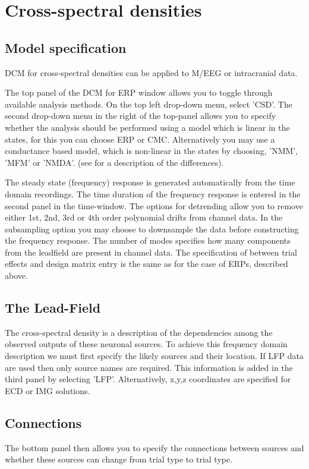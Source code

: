 \section{Cross-spectral densities}

\subsection{Model specification}
DCM for cross-spectral densities can be applied to M/EEG or intracranial data.

The top panel of the DCM for ERP window allows you to toggle through available analysis methods. On the top left drop-down menu, select 'CSD'. The second drop-down menu in the right of the top-panel allows you to specify whether the analysis should be performed using a model which is linear in the states, for this you can choose ERP or CMC. Alternatively you may use a conductance based model, which is non-linear in the states by choosing, 'NMM', 'MFM' or 'NMDA'. (see \cite{andre_sigmoid} for a description of the differences).

The steady state (frequency) response is generated automatically from the time domain recordings. The time duration of the frequency response is entered in the second panel in the time-window.  The options for detrending allow you to remove either 1st, 2nd, 3rd or 4th order polynomial drifts from channel data. In the subsampling option you may choose to downsample the data before constructing the frequency response. The number of modes specifies how many components from the leadfield are present in channel data. The specification of between trial effects and design matrix entry is the same as for the case of ERPs, described above.

\subsection{The Lead-Field}
The cross-spectral density is a description of the dependencies among the observed outputs of these neuronal sources. To achieve this frequency domain description we must first specify the likely sources and their location. If LFP data are used then only source names are required. This information is added in the third panel by selecting 'LFP'. Alternatively, x,y,z coordinates are specified for ECD or IMG solutions.


\subsection{Connections}
The bottom panel then allows you to specify the connections between sources and whether these sources can change from trial type to trial type.

